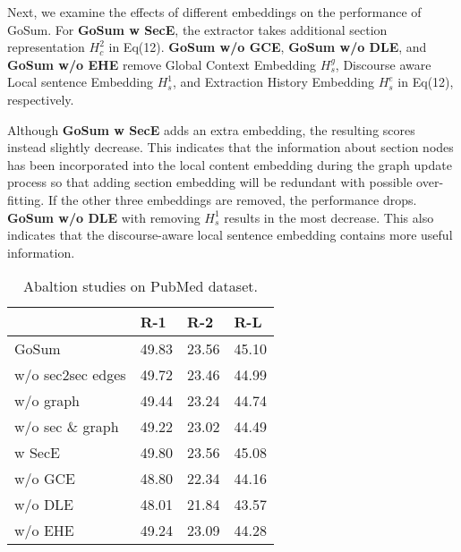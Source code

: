 \documentclass[11pt,a4paper]{article}
\begin{document}
Next, we examine the effects of different embeddings on the performance of GoSum.
For \textbf{GoSum w SecE}, the extractor takes additional section representation $H_c^2$ in Eq(12).
\textbf{GoSum w/o GCE}, \textbf{GoSum w/o DLE}, and \textbf{GoSum w/o EHE}
remove Global Context Embedding $H_s^g$, Discourse aware Local sentence Embedding $H_s^1$, and Extraction History Embedding $H_s^e$ in Eq(12), respectively.

Although \textbf{GoSum w SecE} adds an extra embedding, the resulting scores instead slightly decrease. This indicates that the information about section nodes has been incorporated into the local content embedding during the graph update process so that adding section embedding will be redundant with possible over-fitting.
If the other three embeddings are removed, the performance drops. \textbf{GoSum w/o DLE} with removing $H_s^1$ results in the most decrease. This  also indicates that the discourse-aware local sentence embedding contains more useful information.

\begin{table}[t]
  \centering
  \begin{tabular}{l|p{13mm}p{13mm}p{13mm}}\toprule
                              & \hfil R-1  & \hfil R-2  & \hfil R-L    \\ \midrule
        GoSum                 & \hfil 49.83 & \hfil 23.56 & \hfil 45.10   \\ \midrule
        \quad w/o sec2sec edges     & \hfil 49.72 & \hfil 23.46 & \hfil 44.99   \\
        \quad w/o graph             & \hfil 49.44 & \hfil 23.24 & \hfil 44.74   \\
        \quad w/o sec \& graph      & \hfil 49.22 & \hfil 23.02 & \hfil 44.49   \\ \midrule
        \quad w   SecE              & \hfil 49.80 & \hfil 23.56 & \hfil 45.08   \\
        \quad w/o GCE               & \hfil 48.80 & \hfil 22.34 & \hfil 44.16   \\
        \quad w/o DLE               & \hfil 48.01 & \hfil 21.84 & \hfil 43.57   \\
        \quad w/o EHE               & \hfil 49.24 & \hfil 23.09 & \hfil 44.28   \\ \bottomrule
  \end{tabular}
  \caption{Abaltion studies on PubMed dataset.} \label{tab:ablation_pubmed}
\end{table}
\end{document}
